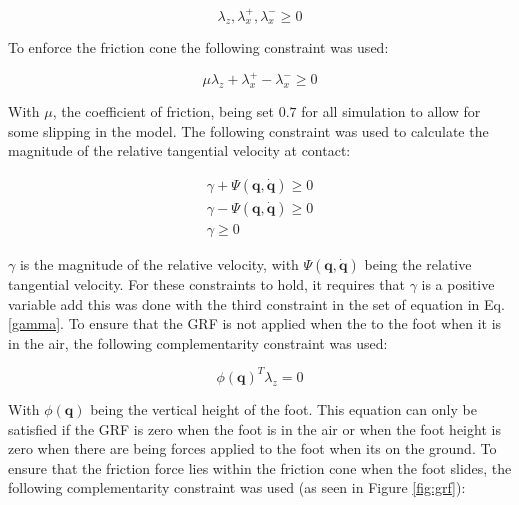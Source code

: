        \begin{equation}
            \lambda_z, \lambda_x^+, \lambda_x^- \geq 0
        \end{equation}
        
        To enforce the friction cone the following constraint was used:
        
        \begin{equation}
            \mu \lambda_z + \lambda_x^+ - \lambda_x^- \geq 0
        \end{equation}
        
        With $\mu$, the coefficient of friction, being set $0.7$ for all simulation to allow for some slipping in the model. The following constraint was used to calculate the magnitude of the relative tangential velocity at contact:
        
        \begin{equation} \label{gamma}
            \begin{split}
                \gamma + \Psi(\bm{q},\bm{\dot{q}}) \geq 0 \\
                \gamma - \Psi(\bm{q},\bm{\dot{q}}) \geq 0 \\
                \gamma \geq 0
            \end{split}
        \end{equation}
        
        $\gamma$ is the magnitude of the relative velocity, with $\Psi(\bm{q},\bm{\dot{q}})$ being the relative tangential velocity. For these constraints to hold, it requires that $\gamma$ is a positive variable add this was done with the third constraint in the set of equation in Eq. \ref{gamma}. To ensure that the GRF is not applied when the to the foot when it is in the air, the following complementarity constraint was used:
        
        \begin{equation}
            \phi(\bm{q})^T \lambda_z = 0
        \end{equation}
        
        With $\phi(\bm{q})$ being the vertical height of the foot. This equation can only be satisfied if the GRF is zero when the foot is in the air or when the foot height is zero when there are being forces applied to the foot when its on the ground. To ensure that the friction force lies within the friction cone when the foot slides, the following complementarity constraint was used (as seen in Figure \ref{fig:grf}):
        
